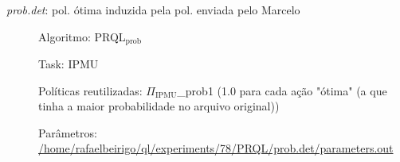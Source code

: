 \documentclass[11pt]{article}
\begin{document}
\begin{description}

\item[\emph{prob.det}: pol. ótima induzida pela pol. enviada pelo Marcelo]\label{sec-12.4.1.2}


\begin{description}

\item[Algoritmo: PRQL$_{\mathrm{prob}}$]\label{sec-12.4.1.2.1}


\end{description}
\begin{description}

\item[Task: IPMU]\label{sec-12.4.1.2.2}


\end{description}
\begin{description}

\item[Políticas reutilizadas: $\Pi$$_{\mathrm{IPMU}}$\_{}prob1 (1.0 para cada ação "ótima" (a que tinha a maior probabilidade no arquivo original))]\label{sec-12.4.1.2.3}


\end{description}
\begin{description}

\item[Parâmetros: \href{file:///home/rafaelbeirigo/ql/experiments/78/PRQL/prob.det/parameters.out}{/home/rafaelbeirigo/ql/experiments/78/PRQL/prob.det/parameters.out}]\label{sec-12.4.1.2.4}



\end{description}
\end{description}
\end{document}

